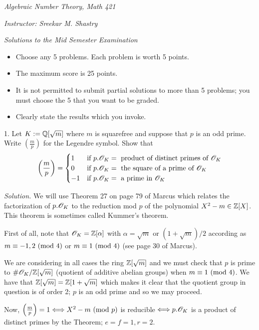 \documentclass[10pt,a4paper,reqno]{amsart}
\begin{document}


\noindent \textit{Algebraic Number Theory, Math 421}

\noindent \textit{Instructor: Sreekar M. Shastry}

\noindent \textit{Solutions to the Mid Semester Examination}

\bigskip

\begin{itemize}
  \item Choose any 5 problems. Each problem is worth 5 points.
  \item The maximum score is 25 points.
  \item It is not permitted to submit partial solutions to more than 5
    problems; you must choose the 5 that you want to be graded.
  \item Clearly state the results which you invoke.
\end{itemize}

\bigskip

1. Let $K := \mathbb{Q}[\sqrt{m}]$ where $m$ is squarefree and suppose that $p$ is an
odd prime. Write $\left( \frac{m}{p} \right)$ for the Legendre symbol. Show
that
\[ \left( \frac{m}{p} \right) =
\begin{cases}
    1 & \text{if } p.\mathscr{O}_K = \text{ product of distinct primes of } \mathscr{O}_K\\
    0 & \text{if } p.\mathscr{O}_K = \text{ the square of a prime of } \mathscr{O}_K\\
    -1 & \text{if } p.\mathscr{O}_K = \text{ a prime in } \mathscr{O}_K
\end{cases} \]

\textit{Solution.} We will use Theorem 27 on page 79 of Marcus which relates
the factorization of $p.\mathscr{O}_K$ to the reduction mod $p$ of the polynomial $X^2 -
m\in \mathbb{Z}[X]$. This theorem is sometimes called Kummer's theorem.

First of all, note that $\mathscr{O}_K = \mathbb{Z}[\alpha]$ with $\alpha = \sqrt{m}$ or
$(1+\sqrt{m})/2$ according as $m\equiv -1,2\text{ } (\mathrm{mod}\text{ } 4)$ or $m \equiv 1\text{ } (\mathrm{mod}\text{ } 4)$
(see page 30 of Marcus).

We are considering in all cases the ring $\mathbb{Z}[\sqrt{m}]$ and we must check that
$p$ is prime to $\#\mathscr{O}_K/\mathbb{Z}[\sqrt{m}]$ (quotient of additive abelian groups) when
$m\equiv 1 \text{ } (\mathrm{mod}\text{ } 4)$. We have that $\mathbb{Z}[\sqrt{m}] = \mathbb{Z}[1+\sqrt{m}]$ which makes
it clear that the quotient group in question is of order 2; $p$ is an odd prime
and so we may proceed.

Now, $\left( \frac{m}{p} \right) = 1 \Longleftrightarrow X^2-m \text{ } (\mathrm{mod}\text{ } p)$ is
reducible $\Longleftrightarrow p.\mathscr{O}_K$ is a product of distinct primes by the
Theorem; $e=f=1, r=2.$
\end{document}
